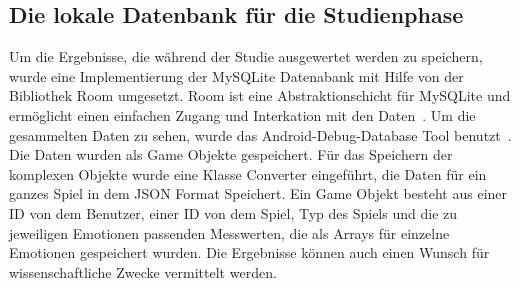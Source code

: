 \subsection{Die lokale Datenbank für die Studienphase}
Um die Ergebnisse, die während der Studie ausgewertet werden zu speichern, wurde eine Implementierung der MySQLite Datenabank mit Hilfe von der Bibliothek Room umgesetzt.
Room ist eine Abstraktionschicht für MySQLite und ermöglicht einen einfachen Zugang und Interkation mit den Daten~\cite{Room}. Um die gesammelten Daten zu sehen, wurde das Android-Debug-Database Tool benutzt~\cite{ADD}. Die Daten wurden als Game Objekte gespeichert. Für das Speichern der komplexen Objekte wurde eine Klasse Converter eingeführt, die Daten für ein ganzes Spiel in dem JSON Format Speichert. Ein Game Objekt besteht aus einer ID von dem Benutzer, einer ID von dem Spiel, Typ des Spiels und die zu jeweiligen Emotionen passenden Messwerten, die als Arrays für einzelne Emotionen gespeichert wurden.
Die Ergebnisse können auch einen Wunsch für wissenschaftliche Zwecke vermittelt werden.
